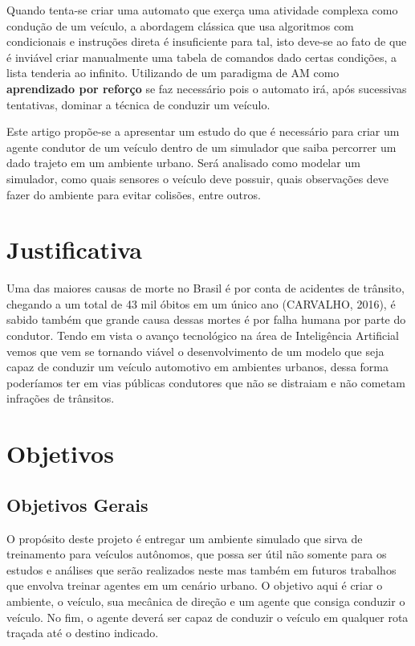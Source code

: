 Quando tenta-se criar uma automato que exerça uma atividade complexa como condução de um veículo, a abordagem clássica que usa algoritmos com condicionais e instruções direta é insuficiente para tal, isto deve-se ao fato de que é inviável criar manualmente uma tabela de comandos dado certas condições, a lista tenderia ao infinito. Utilizando de um paradigma de AM como \textbf{aprendizado por reforço} se faz necessário pois o automato irá, após sucessivas tentativas, dominar a técnica de conduzir um veículo.

\begin{comment}
    Introduzir brevemente o PPO e SAC aqui
\end{comment}

Este artigo propõe-se a apresentar um estudo do que é necessário para criar um agente condutor de um veículo dentro de um simulador que saiba percorrer um dado trajeto em um ambiente urbano. Será analisado como modelar um simulador, como quais sensores o veículo deve possuir, quais observações deve fazer do ambiente para evitar colisões, entre outros.


\section*{Justificativa}\label{sec:justificativa}
Uma das maiores causas de morte no Brasil é por conta de acidentes de trânsito, chegando a um total de 43 mil óbitos em um único ano (CARVALHO, 2016), é sabido também que grande causa dessas mortes é por falha humana por parte do condutor. Tendo em vista o avanço tecnológico na área de Inteligência Artificial vemos que vem se tornando viável o desenvolvimento de um modelo que seja capaz de conduzir um veículo automotivo em ambientes urbanos, dessa forma poderíamos ter em vias públicas condutores que não se distraiam e não cometam infrações de trânsitos.


\section*{Objetivos}\label{sec:objetivos}
\subsection*{Objetivos Gerais}
O propósito deste projeto é entregar um ambiente simulado que sirva de treinamento para veículos autônomos, que possa ser útil não somente para os estudos e análises que serão realizados neste mas também em futuros trabalhos que envolva treinar agentes em um cenário urbano. O objetivo aqui é criar o ambiente, o veículo, sua mecânica de direção e um agente que consiga conduzir o veículo. No fim, o agente deverá ser capaz de conduzir o veículo em qualquer rota traçada até o destino indicado.

